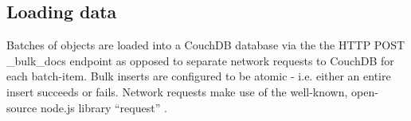 \subsection{Loading data}
Batches of objects are loaded into a CouchDB database via the the HTTP POST \_bulk\_docs endpoint as opposed to separate network requests to CouchDB for each batch-item. Bulk inserts are configured to be atomic - i.e. either an entire insert succeeds or fails. Network requests make use of the well-known, open-source node.js library ``request'' \cite{request-lib}.